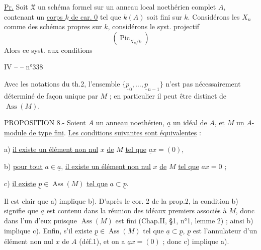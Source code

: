 
\uline{Pr.} Soit $\mathfrak X$ un schéma formel  sur un anneau local noethérien complet $A$, contenant un \uline{corps $k$ de car. 0} tel que  $k(A)$ soit fini sur $k$. Considérons les $X_n$ comme des schémas propres sur $k$,  considérons le syst. projectif
\[
(\underline{\operatorname{Pic}}_{X_n/k})
\]
Alors ce syst.  aux conditions




IV --  -- \hfill n°338

Avec les notations du th.2, l'ensemble $\{\underline p_0,\ldots,\underline p_{n-1}\}$ n'est pas nécessairement déterminé de façon unique par $M$ ; en particulier il peut être distinct de $\operatorname{Ass}(M)$.

PROPOSITION 8.- \uline{Soient} $A$ \uline{un anneau noethérien}, $\underline a$ \uline{un idéal de} $A$, \uline{et} $M$ \uline{un $A$-module de type fini}. \uline{Les conditions suivantes sont équivalentes} :

a) \uline{il existe un élément non nul} $x$ \uline{de} $M$ \uline{tel que} $\underline ax=(0)$,

b) \uline{pour tout} $a\in\underline a$, \uline{il existe un élément non nul} $x$ \uline{de} $M$ \uline{tel que} $ax=0$ ;

c) \uline{il existe} $\underline p\in\operatorname{Ass}(M)$ \uline{tel que} $\underline a\subset\underline p$.

Il est clair que a) implique b). D'après le cor. 2 de la prop.2, la condition b) signifie que $\underline a$ est contenu dans la réunion des idéaux premiers associés à $M$, donc dans l'un d'eux puisque $\operatorname{Ass}(M)$ est fini (Chap.II, §1, n°1, lemme 2) ; ainsi b) implique c). Enfin, s'il existe $\underline p\in\operatorname{Ass}(M)$ tel que $\underline a\subset\underline p$, $\underline p$ est l'annulateur d'un élément non nul $x$ de $A$ (déf.1), et on a $\underline ax=(0)$ ; donc c) implique a).

